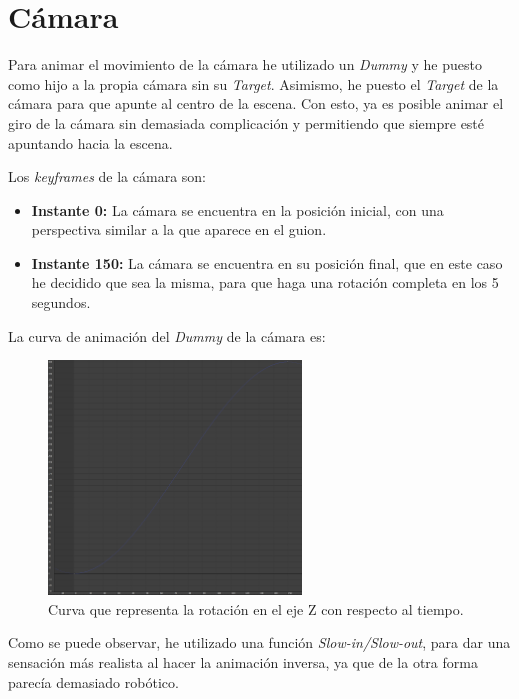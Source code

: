 \section{Cámara}
Para animar el movimiento de la cámara he utilizado un \textit{Dummy} y he puesto como hijo a la propia cámara sin su \textit{Target}. Asimismo, he puesto el \textit{Target} de la cámara para que apunte al centro de la escena. Con esto, ya es posible animar el giro de la cámara sin demasiada complicación y permitiendo que siempre esté apuntando hacia la escena.

\bigskip

Los \textit{keyframes} de la cámara son:

\begin{itemize}
    \item \textbf{Instante 0: }La cámara se encuentra en la posición inicial, con una perspectiva similar a la que aparece en el guion.
    \item \textbf{Instante 150: }La cámara se encuentra en su posición final, que en este caso he decidido que sea la misma, para que haga una rotación completa en los 5 segundos.
\end{itemize}

\bigskip

La curva de animación del \textit{Dummy} de la cámara es:

\begin{figure}[H]
    \centering
    \includegraphics[width=0.6\textwidth]{imagenes/curvas/Camara/blue.png}
    \caption{Curva que representa la rotación en el eje Z con respecto al tiempo.}
 \end{figure}

Como se puede observar, he utilizado una función \textit{Slow-in/Slow-out}, para dar una sensación más realista al hacer la animación inversa, ya que de la otra forma parecía demasiado robótico.

